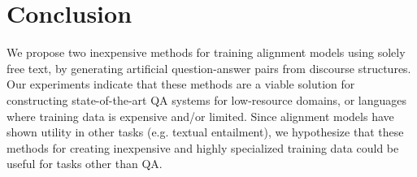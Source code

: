 







\vspace{-1mm}
\section{Conclusion}
\label{sec:conclusion}
\vspace{-2mm}

We propose two inexpensive methods for training alignment models using solely free text, by generating artificial question-answer pairs from discourse structures. 
Our experiments indicate that these methods are a viable solution for constructing state-of-the-art QA systems for low-resource domains, or languages where training data is expensive and/or limited.  Since alignment models have shown utility in other tasks (e.g. textual entailment), we hypothesize that these methods for creating inexpensive and highly specialized training data could be useful for tasks other than QA.  


